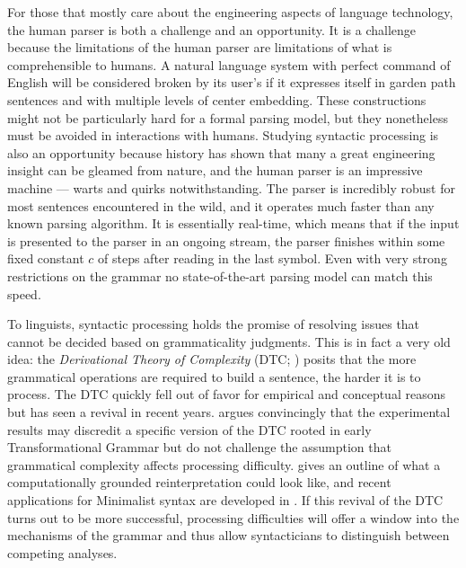 For those that mostly care about the engineering aspects of language technology, the human parser is both a challenge and an opportunity.
It is a challenge because the limitations of the human parser are limitations of what is comprehensible to humans.
A natural language system with perfect command of English will be considered broken by its user's if it expresses itself in garden path sentences and with multiple levels of center embedding.
These constructions might not be particularly hard for a formal parsing model, but they nonetheless must be avoided in interactions with humans.
Studying syntactic processing is also an opportunity because history has shown that many a great engineering insight can be gleamed from nature, and the human parser is an impressive machine --- warts and quirks notwithstanding.
The parser is incredibly robust for most sentences encountered in the wild, and it operates much faster than any known parsing algorithm.
It is essentially real-time, which means that if the input is presented to the parser in an ongoing stream, the parser finishes within some fixed constant $c$ of steps after reading in the last symbol. 
Even with very strong restrictions on the grammar no state-of-the-art parsing model can match this speed.

To linguists, syntactic processing holds the promise of resolving issues that cannot be decided based on grammaticality judgments.
This is in fact a very old idea: the \emph{Derivational Theory of Complexity} (DTC; \citealp{MillerChomsky63,MillerMcKean64}) posits that the more grammatical operations are required to build a sentence, the harder it is to process.
The DTC quickly fell out of favor for empirical \citep{Slobin66} and conceptual reasons \citep[cf.][]{Garnham83} but has seen a revival in recent years.
\citet[Ch.5]{Phillips96} argues convincingly that the experimental results may discredit a specific version of the DTC rooted in early Transformational Grammar but do not challenge the assumption that grammatical complexity affects processing difficulty.
\citet{Hale11} gives an outline of what a computationally grounded reinterpretation could look like, and recent applications for Minimalist syntax are developed in \citet{Kobele.etal12, GrafMarcinek14CMCL, GrafEtAl15MOL}.
If this revival of the DTC turns out to be more successful, processing difficulties will offer a window into the mechanisms of the grammar and thus allow syntacticians to distinguish between competing analyses.

